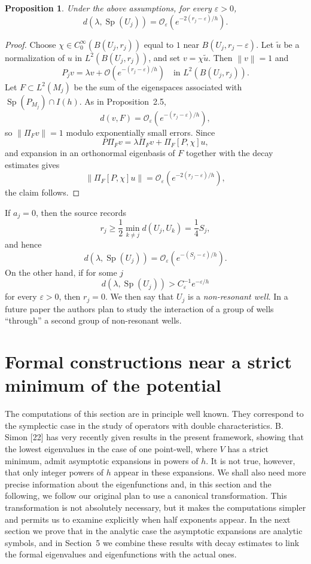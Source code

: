 \documentclass[11pt,a4paper]{article}
\newcommand{\Sp}{\operatorname{Sp}}
\newcommand{\cO}{\mathcal O}
\newcommand{\eps}{\varepsilon}
\newcommand{\norm}[1]{\left\lVert #1\right\rVert}
\numberwithin{equation}{section}
\newtheorem{proposition}[theorem]{Proposition}
\theoremstyle{remark}
\begin{document}
\begin{proposition}
Under the above assumptions, for every $\eps>0$,
\[
d(\lambda,\Sp(U_j))=\cO_\eps\!\left(e^{-2(r_j-\eps)/h}\right).
\]
\end{proposition}
\begin{proof}
Choose $\chi\in C_0^\infty(B(U_j,r_j))$ equal to $1$ near $B(U_j,r_j-\eps)$. Let $\widetilde u$ be a normalization of $u$ in $L^2(B(U_j,r_j))$, and set $v=\chi\widetilde u$. Then $\norm v=1$ and
\begin{equation}
P_jv=\lambda v+\cO\!\left(e^{-(r_j-\eps)/h}\right)
\quad\text{in }L^2(B(U_j,r_j)).
\end{equation}
Let $F\subset L^2(M_j)$ be the sum of the eigenspaces associated with $\Sp(P_{M_j})\cap I(h)$. As in Proposition~2.5,
\[
d(v,F)=\cO_\eps(e^{-(r_j-\eps)/h}),
\]
so $\norm{\Pi_Fv}=1$ modulo exponentially small errors. Since
\[
P\Pi_Fv=\lambda\Pi_Fv+\Pi_F[P,\chi]u,
\]
and expansion in an orthonormal eigenbasis of $F$ together with the decay estimates gives
\[
\norm{\Pi_F[P,\chi]u}=\cO_\eps(e^{-2(r_j-\eps)/h}),
\]
the claim follows.
\end{proof}

If $a_j=0$, then the source records
\[
r_j\ge\frac12\min_{k\ne j}d(U_j,U_k)=\frac14S_j,
\]
and hence
\[
d(\lambda,\Sp(U_j))=\cO_\eps(e^{-(S_j-\eps)/h}).
\]
On the other hand, if for some $j$
\[
d(\lambda,\Sp(U_j))>C_\eps^{-1}e^{-\eps/h}
\]
for every $\eps>0$, then $r_j=0$. We then say that $U_j$ is a \emph{non-resonant well}. In a future paper the authors plan to study the interaction of a group of wells ``through'' a second group of non-resonant wells.

\section{Formal constructions near a strict minimum of the potential}
The computations of this section are in principle well known. They correspond to the symplectic case in the study of operators with double characteristics. B. Simon [22] has very recently given results in the present framework, showing that the lowest eigenvalues in the case of one point-well, where $V$ has a strict minimum, admit asymptotic expansions in powers of $h$. It is not true, however, that only integer powers of $h$ appear in these expansions. We shall also need more precise information about the eigenfunctions and, in this section and the following, we follow our original plan to use a canonical transformation. This transformation is not absolutely necessary, but it makes the computations simpler and permits us to examine explicitly when half exponents appear. In the next section we prove that in the analytic case the asymptotic expansions are analytic symbols, and in Section~5 we combine these results with decay estimates to link the formal eigenvalues and eigenfunctions with the actual ones.
\end{document}
